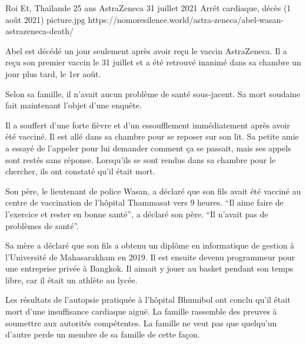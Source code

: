 {Roi Et, Thaïlande}
{25 ans}
{AstraZeneca}
{31 juillet 2021}
{Arrêt cardiaque, décès (1 août 2021)}
{picture.jpg}
{https://nomoresilence.world/astra-zeneca/abel-wasan-astrazeneca-death/}
{

Abel est décédé un jour seulement après avoir reçu le vaccin AstraZeneca. Il a
reçu son premier vaccin le 31 juillet et a été retrouvé inanimé dans sa chambre
un jour plus tard, le 1er août.

Selon sa famille, il n'avait aucun problème de santé sous-jacent. Sa mort
soudaine fait maintenant l'objet d'une enquête.

Il a souffert d'une forte fièvre et d'un essoufflement immédiatement après avoir
été vacciné. Il est allé dans sa chambre pour se reposer sur son lit. Sa petite
amie a essayé de l'appeler pour lui demander comment ça se passait, mais ses
appels sont restés sans réponse. Lorsqu'ils se sont rendus dans sa chambre pour
le chercher, ils ont constaté qu'il était mort.

Son père, le lieutenant de police Wasan, a déclaré que son fils avait été
vacciné au centre de vaccination de l'hôpital Thammasat vers 9 heures. “Il aime
faire de l'exercice et rester en bonne santé”, a déclaré son père. “Il n'avait
pas de problèmes de santé”.

Sa mère a déclaré que son fils a obtenu un diplôme en informatique de gestion à
l'Université de Mahasarakham en 2019. Il est ensuite devenu programmeur pour une
entreprise privée à Bangkok. Il aimait y jouer au basket pendant son temps
libre, car il était un athlète au lycée.

Les résultats de l'autopsie pratiquée à l'hôpital Bhumibol ont conclu qu'il
était mort d'une insuffisance cardiaque aiguë. La famille rassemble des preuves
à soumettre aux autorités compétentes. La famille ne veut pas que quelqu'un
d'autre perde un membre de sa famille de cette façon.

}
